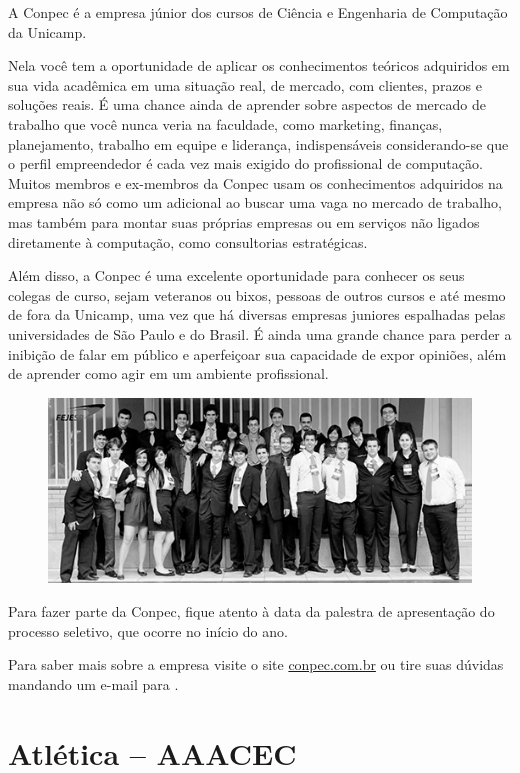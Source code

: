 A Conpec é a empresa júnior dos cursos de Ciência e Engenharia de Computação da
Unicamp.

Nela você tem a oportunidade de aplicar os conhecimentos teóricos
adquiridos em sua vida acadêmica em uma situação real, de mercado, com clientes,
prazos e soluções reais. É uma chance ainda de aprender sobre aspectos de mercado de trabalho que você
nunca veria na faculdade, como marketing, finanças, planejamento, trabalho em equipe e liderança,
indispensáveis considerando-se que o perfil empreendedor é cada vez mais exigido do profissional de
computação. Muitos membros e ex-membros da Conpec usam os
conhecimentos adquiridos na empresa não só como um adicional ao buscar uma vaga
no mercado de trabalho, mas também para montar suas próprias empresas ou em
serviços não ligados diretamente à computação, como consultorias estratégicas.

Além disso, a Conpec é uma excelente oportunidade para conhecer os seus colegas
de curso, sejam veteranos ou bixos, pessoas de outros cursos e até mesmo de fora da
Unicamp, uma vez que há diversas empresas juniores espalhadas pelas universidades de São Paulo e do Brasil. É ainda uma grande chance para perder a inibição de falar em
público e aperfeiçoar sua capacidade de expor opiniões, além de aprender como
agir em um ambiente profissional.

\begin{figure}[H]
    \centering
    \includegraphics[scale=0.40]{img/conpec_foto.jpg}
\end{figure}

Para fazer parte da Conpec, fique atento à data da palestra de apresentação do
processo seletivo, que ocorre no início do ano.

Para saber mais sobre a empresa visite o site \url{conpec.com.br} ou
tire suas dúvidas mandando um e-mail para .

\newpage
\section{Atlética -- AAACEC}

